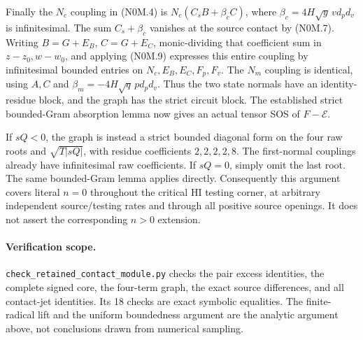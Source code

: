 Finally the $N_c$ coupling in (N0M.4) is
$N_c(C_sB+\beta_cC)$, where
$\beta_c=4H\sqrt y\,v d_pd_v$ is infinitesimal.
The sum $C_s+\beta_c$ vanishes at the source contact by (N0M.7).
Writing $B=G+E_B$, $C=G+E_C$, monic-dividing that coefficient sum in
$z-z_0,w-w_0$, and applying (N0M.9) expresses this entire coupling by
infinitesimal bounded entries on $N_c,E_B,E_C,F_p,F_v$. The $N_m$
coupling is identical, using $A,C$ and
$\beta_m=-4H\sqrt q\,p d_pd_v$. Thus the two state normals have an
identity-residue block, and the graph has the strict circuit block.
The established strict bounded-Gram absorption lemma now gives an
actual tensor SOS of $F-\mathcal E$.

If $sQ<0$, the graph is instead a strict bounded diagonal form on the
four raw roots and $\sqrt{T|sQ|}$, with residue coefficients
$2,2,2,2,8$. The first-normal couplings already have infinitesimal raw
coefficients. If $sQ=0$, simply omit the last root. The same bounded-Gram
lemma applies directly. Consequently this argument covers literal
$n=0$ throughout the critical HI testing corner, at arbitrary independent
source/testing rates and through all positive source openings. It does
not assert the corresponding $n>0$ extension.

\paragraph{Verification scope.}
\texttt{check\_retained\_contact\_module.py} checks the pair excess
identities, the complete signed core, the four-term graph, the exact
source differences, and all contact-jet identities. Its 18 checks are
exact symbolic equalities. The finite-radical lift and the uniform
boundedness argument are the analytic argument above, not conclusions
drawn from numerical sampling.
